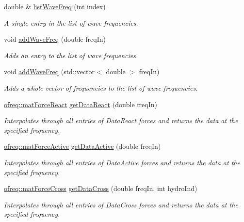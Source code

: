 \begin{DoxyCompactItemize}
double \& \hyperlink{classosea_1_1ofreq_1_1hydro_data_a4ee2d19375355d9191f7a15b2598c7da}{list\-Wave\-Freq} (int index)
\begin{DoxyCompactList}\small\item\em A single entry in the list of wave frequencies. \end{DoxyCompactList}\item 
void \hyperlink{classosea_1_1ofreq_1_1hydro_data_aa5c5240f433a6943096d83d7bbcb4c7a}{add\-Wave\-Freq} (double freq\-In)
\begin{DoxyCompactList}\small\item\em Adds an entry to the list of wave frequencies. \end{DoxyCompactList}\item 
void \hyperlink{classosea_1_1ofreq_1_1hydro_data_ab30be32cc563247fed30c876fa5f136d}{add\-Wave\-Freq} (std\-::vector$<$ double $>$ freq\-In)
\begin{DoxyCompactList}\small\item\em Adds a whole vector of frequencies to the list of wave frequencies. \end{DoxyCompactList}\item 
\hyperlink{classosea_1_1ofreq_1_1mat_force_react}{ofreq\-::mat\-Force\-React} \hyperlink{classosea_1_1ofreq_1_1hydro_data_a2ebaaf494549e170e7a4c3899fe1cf17}{get\-Data\-React} (double freq\-In)
\begin{DoxyCompactList}\small\item\em Interpolates through all entries of Data\-React forces and returns the data at the specified frequency. \end{DoxyCompactList}\item 
\hyperlink{classosea_1_1ofreq_1_1mat_force_active}{ofreq\-::mat\-Force\-Active} \hyperlink{classosea_1_1ofreq_1_1hydro_data_a5950689d2b672d50919f3e85e632b1c4}{get\-Data\-Active} (double freq\-In)
\begin{DoxyCompactList}\small\item\em Interpolates through all entries of Data\-Active forces and returns the data at the specified frequency. \end{DoxyCompactList}\item 
\hyperlink{classosea_1_1ofreq_1_1mat_force_cross}{ofreq\-::mat\-Force\-Cross} \hyperlink{classosea_1_1ofreq_1_1hydro_data_a76e2c149d5d7125ce214d560491697f0}{get\-Data\-Cross} (double freq\-In, int hydro\-Ind)
\begin{DoxyCompactList}\small\item\em Interpolates through all entries of Data\-Cross forces and returns the data at the specified frequency. \end{DoxyCompactList}\item 

\end{DoxyCompactItemize}
